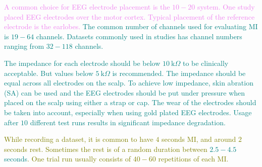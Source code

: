 \textcolor{violet}{A common choice for EEG electrode placement is the $10-20$ system\:\cite{fouadBrainComputerInterface2015}\cite{zhangEEGEMGEOGBased2019}.}
\textcolor{violet}{One study placed EEG electrodes over the motor cortex\:\cite{leebHybridBrainComputer2011}.}
\textcolor{violet}{Typical placement of the reference electrode is the earlobes\:\cite{gordleevaRealTimeEEGEMG2020}\cite{zhangEEGEMGEOGBased2019}.}
\textcolor{teal}{The common number of channels used for evaluating MI is $ 19 - 64 $ channels\:\cite{zhouSignalPredictionbasedMethod2023}. Datasets commonly used in studies has channel numbers ranging from $ 32 - 118 $ channels\:\cite{blankertzBCICompetitionIII2006}.}

\textcolor{teal}{The impedance for each electrode should be below $ 10\:\text{k} \Omega $ to be clinically acceptable\:\cite{lepolaScreenprintedEEGElectrode2014}\cite{sinisaloSurePrepEasyAlternative2012}\cite{goreckaDependenceElectrodeImpedance2019}. But values below $ 5\:\text{k} \Omega $ is recommended\:\cite{goreckaDependenceElectrodeImpedance2019}.}
\textcolor{teal}{The impedance should be equal across all electrodes on the scalp\:\cite{goreckaDependenceElectrodeImpedance2019}.}
\textcolor{teal}{To achieve low impedance, skin abration (SA) can be used\:\cite{lepolaScreenprintedEEGElectrode2014}\cite{sinisaloSurePrepEasyAlternative2012}\cite{goreckaDependenceElectrodeImpedance2019}\cite{liGelfreeElectrodesSystematic2017}}
\textcolor{teal}{and the EEG electrodes should be put under pressure when placed on the scalp using either a strap or cap\:\cite{raduntzSignalQualityEvaluation2018}\cite{liGelfreeElectrodesSystematic2017}.}
\textcolor{teal}{The wear of the electrodes should be taken into account, especially when using gold plated EEG electrodes\:\cite{goreckaDependenceElectrodeImpedance2019}. Usage after $10$ different test runs results in significant impedance degradation\:\cite{goreckaDependenceElectrodeImpedance2019}.}

\textcolor{olive}{While recording a dataset, it is common to have $4$ seconds MI\:\textcolor{violet}{\cite{blankertzOptimizingSpatialFilters2008}\textcolor{teal}{\cite{petersonMotorImageryVs2022}}}, and around $2$ seconds rest\:\cite{tangermannReviewBCICompetition2012}. Sometimes the rest is of a random duration between \textcolor{teal}{$2.5-4.5$ seconds\:\cite{petersonMotorImageryVs2022}}. One trial run usually consists of $40-60$ repetitions of each MI\:\cite{blankertzBCICompetitionIII2006}.}

